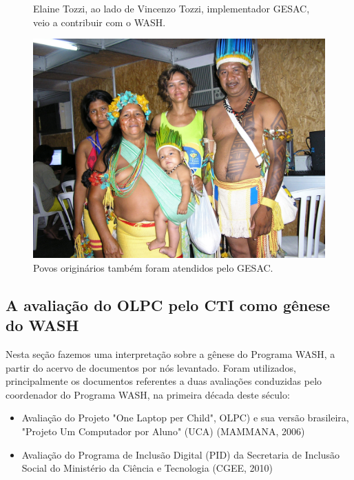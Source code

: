 \begin{figure}[htb]
\begin{minipage}[b]{0.4\linewidth}
                \caption{Elaine Tozzi, ao lado de Vincenzo Tozzi, implementador GESAC, veio a contribuir com o WASH.}
                \label{4459669909728990ef00df4bdb6a369f3449704e}
\end{minipage}
\hspace{0.5cm}
\begin{minipage}[b]{0.4\linewidth}
        \centering
                \includegraphics[width=1.0\linewidth]{../../../imagens/povo.JPG}
                \caption{Povos originários também foram atendidos pelo GESAC.}
                \label{50c13a4f82feece9e41db915d8e5bc4c5d5094dd}
\end{minipage}%
\hspace{0.5cm}
\end{figure}



\subsection[A avaliação do OLPC pelo CTI como gênese do WASH]{A avaliação do OLPC pelo CTI como gênese do WASH}\label{A avaliação do OLPC pelo CTI como gênese do WASH}
Nesta seção fazemos uma interpretação sobre a gênese do Programa WASH, a partir do acervo de documentos por nós levantado. Foram utilizados, principalmente  os documentos referentes a duas avaliações conduzidas pelo coordenador do Programa WASH, na primeira década deste século:


\begin{itemize}
\item Avaliação do Projeto "One Laptop per Child", OLPC) e sua versão brasileira, "Projeto Um Computador por Aluno" (UCA) (MAMMANA, 2006)
\item Avaliação do Programa de Inclusão Digital (PID) da Secretaria de Inclusão Social do Ministério da Ciência e Tecnologia (CGEE, 2010)
\end{itemize}

